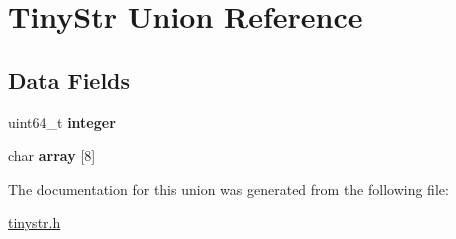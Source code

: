 \hypertarget{unionTinyStr}{}\section{Tiny\+Str Union Reference}
\label{unionTinyStr}
\subsection*{Data Fields}
\begin{DoxyCompactItemize}
\item 
uint64\+\_\+t {\bfseries integer}\hypertarget{unionTinyStr_ac7b6c2be68ebace734f0f39686d5f6ce}{}\label{unionTinyStr_ac7b6c2be68ebace734f0f39686d5f6ce}

\item 
char {\bfseries array} \mbox{[}8\mbox{]}\hypertarget{unionTinyStr_a90c27fcc65993dac2df7ba7451953f55}{}\label{unionTinyStr_a90c27fcc65993dac2df7ba7451953f55}

\end{DoxyCompactItemize}


The documentation for this union was generated from the following file\+:\begin{DoxyCompactItemize}
\item 
\hyperlink{tinystr_8h}{tinystr.\+h}\end{DoxyCompactItemize}
